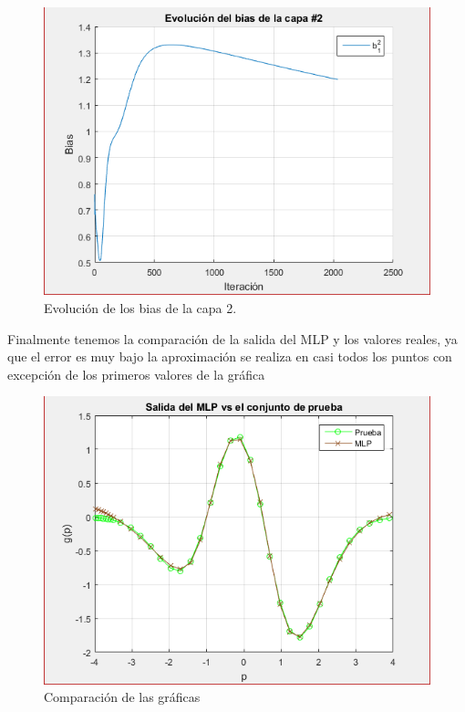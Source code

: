 \begin{figure}[H]
    \begin{center}
        \includegraphics[width=13cm]{2/bias2.png}
        \caption{Evolución de los bias de la capa 2.}
        \label{fig:bias4}
    \end{center}
\end{figure}
Finalmente tenemos la comparación de la salida del MLP y los valores reales, ya que el error es muy bajo la aproximación se realiza en casi todos los puntos con excepción de los primeros valores de la gráfica
\begin{figure}[H]
    \begin{center}
        \includegraphics[width=16cm]{2/prueba.png}
        \caption{Comparación de las gráficas}
        \label{fig:prueba2}
    \end{center}
\end{figure}
